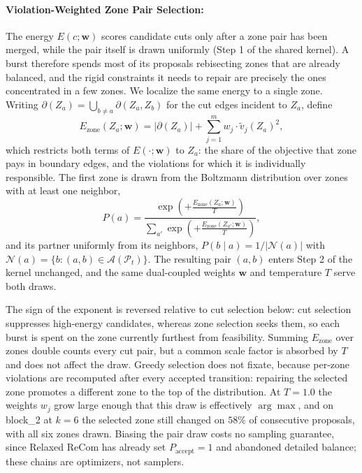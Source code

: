 \documentclass{article}
\begin{document}
\paragraph{Violation-Weighted Zone Pair Selection:} The energy $E(c; \mathbf{w})$ scores candidate cuts only after a zone pair has been merged, while the pair itself is drawn uniformly (Step 1 of the shared kernel). A burst therefore spends most of its proposals rebisecting zones that are already balanced, and the rigid constraints it needs to repair are precisely the ones concentrated in a few zones. We localize the same energy to a single zone. Writing $\partial(Z_a) = \bigcup_{b \neq a} \partial(Z_a, Z_b)$ for the cut edges incident to $Z_a$, define
\begin{equation}
E_{\mathrm{zone}}(Z_a; \mathbf{w}) = |\partial(Z_a)| + \sum_{j=1}^m w_j \cdot \widetilde{v}_j(Z_a)^2 ,
\end{equation}
which restricts both terms of $E(\cdot; \mathbf{w})$ to $Z_a$: the share of the objective that zone pays in boundary edges, and the violations for which it is individually responsible. The first zone is drawn from the Boltzmann distribution over zones with at least one neighbor,
\begin{equation}
P(a) = \frac{\exp\left( + \frac{E_{\mathrm{zone}}(Z_a; \mathbf{w})}{T} \right)}{\sum_{a'} \exp\left( + \frac{E_{\mathrm{zone}}(Z_{a'}; \mathbf{w})}{T} \right)} ,
\end{equation}
and its partner uniformly from its neighbors, $P(b \mid a) = 1/|\mathcal{N}(a)|$ with $\mathcal{N}(a) = \{b : (a, b) \in \mathcal{A}(\mathcal{P}_t)\}$. The resulting pair $(a, b)$ enters Step 2 of the kernel unchanged, and the same dual-coupled weights $\mathbf{w}$ and temperature $T$ serve both draws.

The sign of the exponent is reversed relative to cut selection below: cut selection suppresses high-energy candidates, whereas zone selection seeks them, so each burst is spent on the zone currently furthest from feasibility. Summing $E_{\mathrm{zone}}$ over zones double counts every cut pair, but a common scale factor is absorbed by $T$ and does not affect the draw. Greedy selection does not fixate, because per-zone violations are recomputed after every accepted transition: repairing the selected zone promotes a different zone to the top of the distribution. At $T = 1.0$ the weights $w_j$ grow large enough that this draw is effectively $\arg\max$, and on block\_2 at $k = 6$ the selected zone still changed on $58\%$ of consecutive proposals, with all six zones drawn. Biasing the pair draw costs no sampling guarantee, since Relaxed ReCom has already set $P_{\text{accept}} = 1$ and abandoned detailed balance; these chains are optimizers, not samplers.
\end{document}
